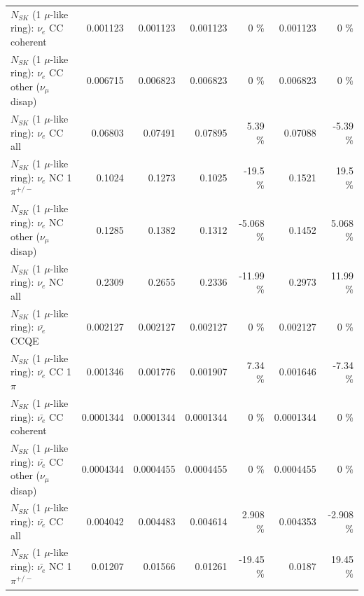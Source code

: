 \begin{table}
\begin{tabular}{| l | r | r | r  r | r  r |}
                               $N_{SK}$ (1 $\mu$-like ring): $\nu_e$ CC coherent &        0.001123 &        0.001123 &        0.001123 &        0 \%  &        0.001123 &        0 \%  \\ 
                $N_{SK}$ (1 $\mu$-like ring): $\nu_e$ CC other ($\nu_\mu$ disap) &        0.006715 &        0.006823 &        0.006823 &        0 \%  &        0.006823 &        0 \%  \\ 
                                  $N_{SK}$ (1 $\mu$-like ring): $\nu_{e}$ CC all &         0.06803 &         0.07491 &         0.07895 &     5.39 \%  &         0.07088 &    -5.39 \%  \\ 
\hline
                           $N_{SK}$ (1 $\mu$-like ring): $\nu_e$ NC 1$\pi^{+/-}$ &          0.1024 &          0.1273 &          0.1025 &    -19.5 \%  &          0.1521 &     19.5 \%  \\ 
                $N_{SK}$ (1 $\mu$-like ring): $\nu_e$ NC other ($\nu_\mu$ disap) &          0.1285 &          0.1382 &          0.1312 &   -5.068 \%  &          0.1452 &    5.068 \%  \\ 
                                  $N_{SK}$ (1 $\mu$-like ring): $\nu_{e}$ NC all &          0.2309 &          0.2655 &          0.2336 &   -11.99 \%  &          0.2973 &    11.99 \%  \\ 
\hline
\hline
\hline
                                $N_{SK}$ (1 $\mu$-like ring): $\bar{\nu_e}$ CCQE &        0.002127 &        0.002127 &        0.002127 &        0 \%  &        0.002127 &        0 \%  \\ 
                           $N_{SK}$ (1 $\mu$-like ring): $\bar{\nu_e}$ CC 1$\pi$ &        0.001346 &        0.001776 &        0.001907 &     7.34 \%  &        0.001646 &    -7.34 \%  \\ 
                         $N_{SK}$ (1 $\mu$-like ring): $\bar{\nu_e}$ CC coherent &       0.0001344 &       0.0001344 &       0.0001344 &        0 \%  &       0.0001344 &        0 \%  \\ 
          $N_{SK}$ (1 $\mu$-like ring): $\bar{\nu_e}$ CC other ($\nu_\mu$ disap) &       0.0004344 &       0.0004455 &       0.0004455 &        0 \%  &       0.0004455 &        0 \%  \\ 
                            $N_{SK}$ (1 $\mu$-like ring): $\bar{\nu_{e}}$ CC all &        0.004042 &        0.004483 &        0.004614 &    2.908 \%  &        0.004353 &   -2.908 \%  \\ 
\hline
                     $N_{SK}$ (1 $\mu$-like ring): $\bar{\nu_e}$ NC 1$\pi^{+/-}$ &         0.01207 &         0.01566 &         0.01261 &   -19.45 \%  &          0.0187 &    19.45 \%  \\ 

\end{tabular}
\end{table}
